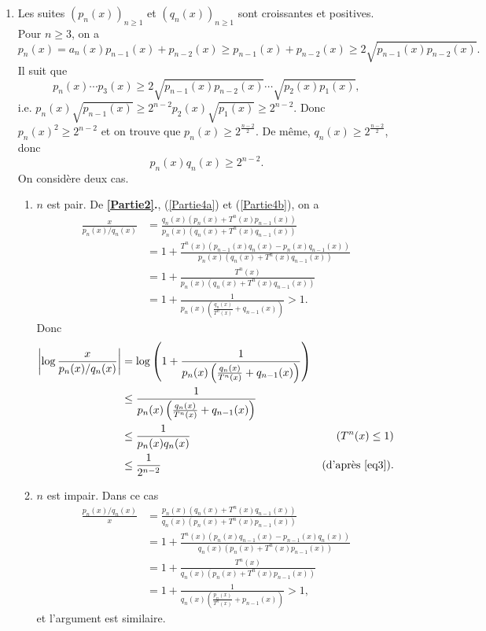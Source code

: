 \documentclass[french]{article}
\theoremstyle{definition}
\newcommand{\tuple}[1]{\left(#1\right)}
\newcommand{\abs}[1]{\left|#1\right|}
\begin{document}
\begin{enumerate}
    \item Les suites $(p_n(x))_{n \ge 1}$ et $(q_n(x))_{n \ge 1}$ sont croissantes et positives. Pour $n \ge 3$, on a
        $$p_n(x) = a_n(x)p_{n-1}(x) + p_{n-2}(x) \ge p_{n-1}(x) + p_{n-2}(x) \ge 2\sqrt{p_{n-1}(x)p_{n-2}(x)}.$$
    Il suit que
        $$p_n(x) \cdots p_3(x) \ge 2\sqrt{p_{n-1}(x)p_{n-2}(x)} \cdots \sqrt{p_{2}(x)p_{1}(x)},$$
    i.e. $p_n(x)\sqrt{p_{n-1}(x)} \ge 2^{n-2}p_2(x)\sqrt{p_1(x)} \ge 2^{n-2}$. Donc $p_n(x)^2 \ge 2^{n-2}$ et on trouve que $p_n(x) \ge 2^{\frac{n-2}{2}}$. De m\^eme, $q_n(x) \ge 2^{\frac{n-2}{2}}$, donc 
        \begin{equation} \label{eq3}
            p_n(x)q_n(x) \ge 2^{n-2}.
        \end{equation}
    On consid\`ere deux cas.
    \begin{enumerate}
        \item $n$ est pair. De {\bf \ref{Partie2}.}, (\ref{Partie4a}) et (\ref{Partie4b}), on a
            \begin{align*}
                \frac{x}{p_n(x)/q_n(x)} & = \frac{q_n(x)(p_n(x) + T^n(x)p_{n-1}(x))}{p_n(x)(q_n(x) + T^n(x)q_{n-1}(x))} \\
                & = 1 + \frac{T^n(x)(p_{n-1}(x)q_n(x) - p_n(x)q_{n-1}(x))}{p_n(x)(q_n(x) + T^n(x)q_{n-1}(x))} \\
                & = 1 + \frac{T^n(x)}{p_n(x)(q_n(x) + T^n(x)q_{n-1}(x))}\\
                & = 1 + \frac{1}{p_n(x)\tuple{\frac{q_n(x)}{T^n(x)} + q_{n-1}(x)}} > 1.
            \end{align*}
        Donc
            \begin{align*}
                \abs{\log \frac{x}{p_n(x)/q_n(x)}} & = \log\tuple{1 + \frac{1}{p_n(x)\tuple{\frac{q_n(x)}{T^n(x)} + q_{n-1}(x)}}} \\
                & \le \frac{1}{p_n(x)\tuple{\frac{q_n(x)}{T^n(x)} + q_{n-1}(x)}}\\
                & \le \frac{1}{p_n(x)q_n(x)} & (T^n(x) \le 1) \\
                & \le \frac{1}{2^{n-2}} & (\text{d'apr\`es \eqref{eq3}}).
            \end{align*}
        
    \item $n$ est impair. Dans ce cas
        \begin{align*}
                \frac{p_n(x)/q_n(x)}{x} & = \frac{p_n(x)(q_n(x) + T^n(x)q_{n-1}(x))}{q_n(x)(p_n(x) + T^n(x)p_{n-1}(x))} \\
                & = 1 + \frac{T^n(x)(p_{n}(x)q_{n-1}(x) - p_{n-1}(x)q_{n}(x))}{q_n(x)(p_n(x) + T^n(x)p_{n-1}(x))} \\
                & = 1 + \frac{T^n(x)}{q_n(x)(p_n(x) + T^n(x)p_{n-1}(x))}\\
                & = 1 + \frac{1}{q_n(x)\tuple{\frac{p_n(x)}{T^n(x)} + p_{n-1}(x)}} > 1,
            \end{align*}
        et l'argument est similaire.
    \end{enumerate}
\end{enumerate}
\end{document}
